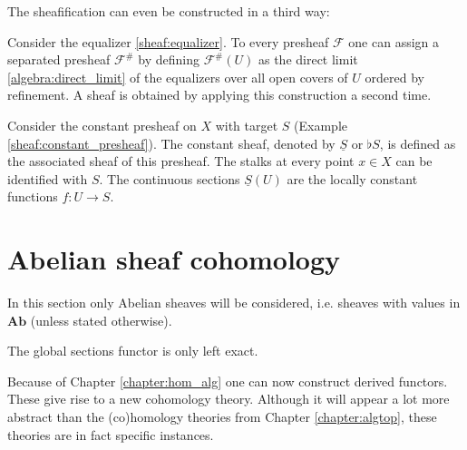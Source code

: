 
    The sheafification can even be constructed in a third way:
    \begin{construct}\label{sheaf:colimit_construction}
        Consider the equalizer \eqref{sheaf:equalizer}. To every presheaf $\mathcal{F}$ one can assign a separated presheaf $\mathcal{F}^\#$ by defining $\mathcal{F}^\#(U)$ as the direct limit \ref{algebra:direct_limit} of the equalizers over all open covers of $U$ ordered by refinement. A sheaf is obtained by applying this construction a second time.
    \end{construct}

    \begin{example}\label{sheaf:constant_sheaf}
        Consider the constant presheaf on $X$ with target $S$ (Example \ref{sheaf:constant_presheaf}). The constant sheaf, denoted by $\underline{S}$ or $\flat S$, is defined as the associated sheaf of this presheaf. The stalks at every point $x\in X$ can be identified with $S$. The continuous sections $\underline{S}(U)$ are the locally constant functions $f:U\rightarrow S$.
    \end{example}

\section{Abelian sheaf cohomology}

    In this section only Abelian sheaves will be considered, i.e. sheaves with values in $\mathbf{Ab}$ (unless stated otherwise).

    \begin{property}\label{sheaf:left_exact_functor}
        The global sections functor is only left exact.
    \end{property}

    Because of Chapter \ref{chapter:hom_alg} one can now construct derived functors. These give rise to a new cohomology theory. Although it will appear a lot more abstract than the (co)homology theories from Chapter \ref{chapter:algtop}, these theories are in fact specific instances.

